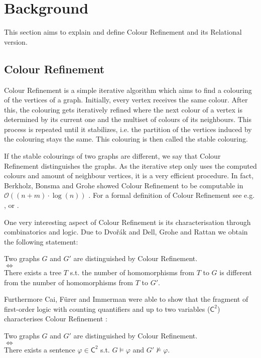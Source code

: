 \documentclass[a4paper,11pt,DIV=15]{scrartcl} %
\theoremstyle{plain}
\theoremstyle{definition}
\begin{document}
\section{Background}

This section aims to explain and define Colour Refinement and its Relational version.

\subsection{Colour Refinement} \label{sec::CR}

Colour Refinement is a simple iterative algorithm which aims to find a colouring of the vertices of a graph.
Initially, every vertex receives the same colour. 
After this, the colouring gets iteratively refined where the next colour of a vertex is determined by its current one and the multiset of colours of its neighbours.
This process is repeated until it stabilizes, i.e. the partition of the vertices induced by the colouring stays the same. This colouring is then called the stable colouring.

If the stable colourings of two graphs are different, we say that Colour Refinement distinguishes the graphs.
As the iterative step only uses the computed colours and amount of neighbour vertices, it is a very efficient procedure.
In fact, Berkholz, Bonsma and Grohe showed Colour Refinement to be computable in $\mathcal O((n+m)\cdot\log (n))$ \cite{berkholz2017TightLower}.
For a formal definition of Colour Refinement see e.g. \cite{kiefer2020power}, \cite{scheidt2024color} or \cite{grohe2021color}.

One very interesting aspect of Colour Refinement is its characterisation through combinatorics and logic.
Due to Dvo\v r\'ak \cite{dvovrak2010recognizing} and Dell, Grohe and Rattan \cite{dell2018LovaszMeets} we obtain the following statement:
\begin{center}
	Two graphs $G$ and $G'$ are distinguished by Colour Refinement.
	\\ $\Longleftrightarrow$ \\ 
	There exists a tree $T$ s.t. the number of homomorphisms from $T$ to $G$ is different from the number of homomorphisms from $T$ to $G'$.
\end{center}
Furthermore Cai, Fürer and Immerman were able to show that the fragment of first-order logic with counting quantifiers and up to two variables ($\mathsf C^2$) characterises Colour Refinement \cite{cai1992optimal}:
\begin{center}
	Two graphs $G$ and $G'$ are distinguished by Colour Refinement.
	\\ $\Longleftrightarrow$ \\ 
	There exists a sentence $\varphi\in \mathsf C^2$ s.t. $G\models \varphi$ and $G'\not\models\varphi$.
\end{center}
\end{document}
